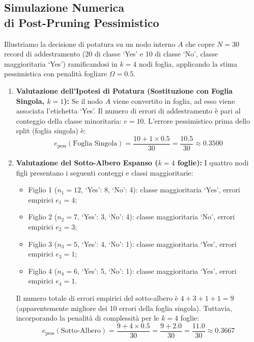 \FloatBarrier
\subsection[Simulazione Numerica di Post-Pruning]{Simulazione Numerica\\di Post-Pruning Pessimistico}
\label{subsec:dm-post-pruning-numeric-trace}

Illustriamo la decisione di potatura su un nodo interno $A$ che copre $N = 30$ record di addestramento (20 di classe `Yes' e 10 di classe `No', classe maggioritaria `Yes') ramificandosi in $k = 4$ nodi foglia, applicando la stima pessimistica con penalità fogliare $\Omega = 0.5$.

\begin{enumerate}
    \item \textbf{Valutazione dell'Ipotesi di Potatura (Sostituzione con Foglia Singola, $k = 1$):}
    Se il nodo $A$ viene convertito in foglia, ad esso viene associata l'etichetta `Yes'. Il numero di errori di addestramento è pari al conteggio della classe minoritaria: $e = 10$.
    L'errore pessimistico prima dello split (foglia singola) è:
    \begin{equation}
        e_{\text{pess}}(\text{Foglia Singola}) = \frac{10 + 1 \times 0.5}{30} = \frac{10.5}{30} \approx 0.3500
    \end{equation}

    \item \textbf{Valutazione del Sotto-Albero Espanso ($k = 4$ foglie):}
    I quattro nodi figli presentano i seguenti conteggi e classi maggioritarie:
    \begin{itemize}
        \item Figlio 1 ($n_1 = 12$, `Yes': 8, `No': 4): classe maggioritaria `Yes', errori empirici $e_1 = 4$;
        \item Figlio 2 ($n_2 = 7$, `Yes': 3, `No': 4): classe maggioritaria `No', errori empirici $e_2 = 3$;
        \item Figlio 3 ($n_3 = 5$, `Yes': 4, `No': 1): classe maggioritaria `Yes', errori empirici $e_3 = 1$;
        \item Figlio 4 ($n_4 = 6$, `Yes': 5, `No': 1): classe maggioritaria `Yes', errori empirici $e_4 = 1$.
    \end{itemize}
    Il numero totale di errori empirici del sotto-albero è $4 + 3 + 1 + 1 = 9$ (apparentemente migliore dei 10 errori della foglia singola). Tuttavia, incorporando la penalità di complessità per le $k = 4$ foglie:
    \begin{equation}
        e_{\text{pess}}(\text{Sotto-Albero}) = \frac{9 + 4 \times 0.5}{30} = \frac{9 + 2.0}{30} = \frac{11.0}{30} \approx 0.3667
    \end{equation}
\end{enumerate}

